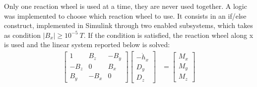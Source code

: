 Only one reaction wheel is used at a time, they are never used together. A logic was implemented to choose which reaction wheel to use. It consists in an if/else construct, implemented in Simulink through two enabled subsystems, which takes as condition $|B_x|\geq 10^{-5} \ T$.
If the condition is satisfied, the reaction wheel along x is used and the linear system reported below is solved:
\begin{equation}
\label{eq:syst1}
\begin{aligned} 
    \begin{bmatrix}
        1 & B_z & -B_y \\
        -B_z & 0 & B_x \\
        B_y & -B_x & 0 
    \end{bmatrix}\begin{bmatrix}
        -\Dot{h}_x \\
        D_y \\
        D_z
    \end{bmatrix} &=\begin{bmatrix}
        M_x \\
        M_y \\
        M_z
    \end{bmatrix}
\end{aligned}
\end{equation}


